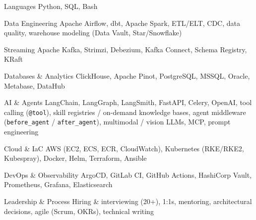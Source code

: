 
%
\begin{cvskills}

  \cvskill
    {Languages}
    {Python, SQL, Bash}

  \cvskill
    {Data Engineering}
    {Apache Airflow, dbt, Apache Spark, ETL/ELT, CDC, data quality, warehouse modeling (Data Vault, Star/Snowflake)}

  \cvskill
    {Streaming}
    {Apache Kafka, Strimzi, Debezium, Kafka Connect, Schema Registry, KRaft}

  \cvskill
    {Databases \& Analytics}
    {ClickHouse, Apache Pinot, PostgreSQL, MSSQL, Oracle, Metabase, DataHub}

  \cvskill
    {AI \& Agents}
    {LangChain, LangGraph, LangSmith, FastAPI, Celery, OpenAI, tool calling (\texttt{@tool}), skill registries / on-demand knowledge bases, agent middleware (\texttt{before\_agent} / \texttt{after\_agent}), multimodal / vision LLMs, MCP, prompt engineering}

  \cvskill
    {Cloud \& IaC}
    {AWS (EC2, ECS, ECR, CloudWatch), Kubernetes (RKE/RKE2, Kubespray), Docker, Helm, Terraform, Ansible}

  \cvskill
    {DevOps \& Observability}
    {ArgoCD, GitLab CI, GitHub Actions, HashiCorp Vault, Prometheus, Grafana, Elasticsearch}

  \cvskill
    {Leadership \& Process}
    {Hiring \& interviewing (20+), 1:1s, mentoring, architectural decisions, agile (Scrum, OKRs), technical writing}

\end{cvskills}
